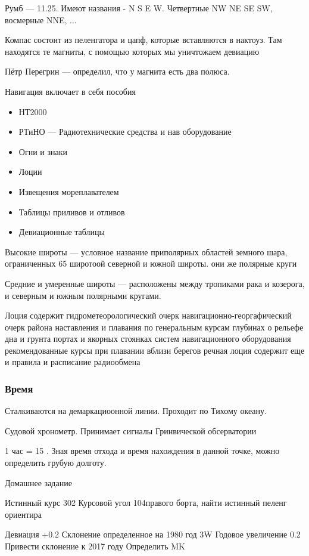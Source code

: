 \documentclass{article}        %
\begin{document}
Румб --- 11.25\degree . Имеют названия - N S E W. Четвертные NW NE SE SW, восмерные NNE, ...

Компас состоит из пеленгатора и цапф, которые вставляются в нактоуз. Там находятся те магниты, с помощью которых мы уничтожаем девиацию

Пётр Перегрин --- определил, что у магнита есть два полюса.

Навигация включает в себя пособия
\begin{itemize}
	\item НТ2000
	\item РТиНО --- Радиотехнические средства и нав оборудование
	\item Огни и знаки 
	\item Лоции
	\item Извещения мореплавателем
	\item Таблицы приливов и отливов
	\item Девиационные таблицы
\end{itemize}

Высокие широты --- условное название приполярных областей земного шара, 
	ограниченных 65 широтоой северной и южной широты. они же полярные круги

Средние и умеренные широты --- расположены между тропиками рака и козерога, 
	и северным и южным полярными кругами.

Лоция содержит
	гидрометеорологический очерк
	навигационно-георгафический очерк района
	наставления и плавания по генеральным курсам
		глубинах о рельефе дна и грунта
		портах и якорных стоянках
		систем навигационного оборудования
	рекомендованные курсы при плавании вблизи берегов
	речная лоция содержит еще и правила и расписание радиообмена

\subsubsection{Время}
Сталкиваются на демаркациоонной линии. Проходит по Тихому океану.

Судовой хронометр. Принимает сигналы Гринвической обсерватории

1 час = 15 \degree.
Зная время отхода и время нахождения в данной точке, можно определить грубую долготу.

Домашнее задание

Истинный курс 302\degree 
Курсовой угол 104\degree правого борта, 
найти истинный пеленг ориентира

Девиация +0.2\degree
Склонение определенное на 1980 год 3\degree W
Годовое увеличение 0.2\degree
Привести склонение к 2017 году
Определить \Delta MK
\end{document}
